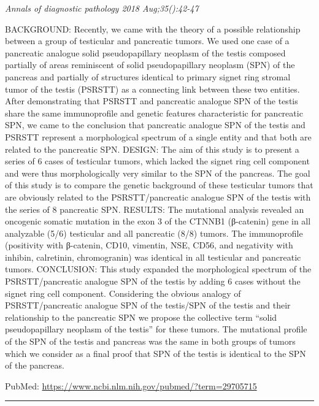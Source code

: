 \documentclass[]{article}
\begin{document}
\emph{Annals of diagnostic pathology 2018 Aug;35():42-47}

BACKGROUND: Recently, we came with the theory of a possible relationship
between a group of testicular and pancreatic tumors. We used one case of
a pancreatic analogue solid pseudopapillary neoplasm of the testis
composed partially of areas reminiscent of solid pseudopapillary
neoplasm (SPN) of the pancreas and partially of structures identical to
primary signet ring stromal tumor of the testis (PSRSTT) as a connecting
link between these two entities. After demonstrating that PSRSTT and
pancreatic analogue SPN of the testis share the same immunoprofile and
genetic features characteristic for pancreatic SPN, we came to the
conclusion that pancreatic analogue SPN of the testis and PSRSTT
represent a morphological spectrum of a single entity and that both are
related to the pancreatic SPN. DESIGN: The aim of this study is to
present a series of 6 cases of testicular tumors, which lacked the
signet ring cell component and were thus morphologically very similar to
the SPN of the pancreas. The goal of this study is to compare the
genetic background of these testicular tumors that are obviously related
to the PSRSTT/pancreatic analogue SPN of the testis with the series of 8
pancreatic SPN. RESULTS: The mutational analysis revealed an oncogenic
somatic mutation in the exon 3 of the CTNNB1 (β-catenin) gene in all
analyzable (5/6) testicular and all pancreatic (8/8) tumors. The
immunoprofile (positivity with β-catenin, CD10, vimentin, NSE, CD56, and
negativity with inhibin, calretinin, chromogranin) was identical in all
testicular and pancreatic tumors. CONCLUSION: This study expanded the
morphological spectrum of the PSRSTT/pancreatic analogue SPN of the
testis by adding 6 cases without the signet ring cell component.
Considering the obvious analogy of PSRSTT/pancreatic analogue SPN of the
testis/SPN of the testis and their relationship to the pancreatic SPN we
propose the collective term ``solid pseudopapillary neoplasm of the
testis'' for these tumors. The mutational profile of the SPN of the
testis and pancreas was the same in both groups of tumors which we
consider as a final proof that SPN of the testis is identical to the SPN
of the pancreas.

PubMed: \url{https://www.ncbi.nlm.nih.gov/pubmed/?term=29705715}

{}

{}

\begin{center}\rule{0.5\linewidth}{\linethickness}\end{center}
\end{document}
